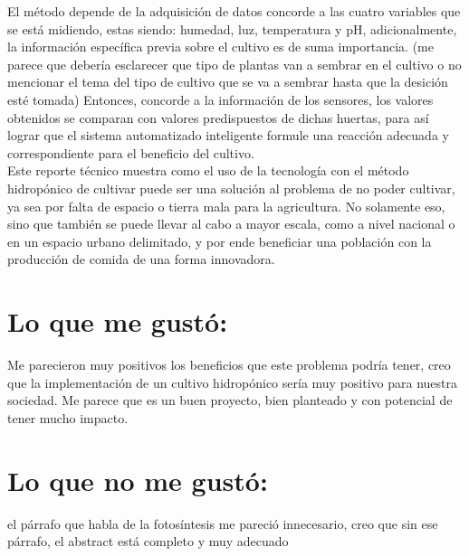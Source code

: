 \documentclass[10pt,a4paper]{article} %
\begin{document}
        \color{blue} El método depende de la adquisición de datos concorde a las cuatro variables
        que se está midiendo, estas siendo: humedad, luz, temperatura y pH, \color{black}
        \color{red} adicionalmente, la información específica previa sobre el cultivo es de suma
        importancia. \color{black}  (me parece que debería esclarecer que tipo
        de plantas van a sembrar en el cultivo o no mencionar el
        tema del tipo de cultivo que se va a sembrar hasta que la desición esté
        tomada)\color{blue} Entonces, concorde a la información de los
        sensores, los valores
        obtenidos se comparan con valores predispuestos de dichas huertas, para así
        lograr que el sistema automatizado inteligente formule una reacción adecuada y
        correspondiente para el beneficio del cultivo. \color{black}  \\

        \color{blue} Este reporte técnico muestra como el uso de la tecnología con el método
        hidropónico de cultivar puede ser una solución al problema de no poder
        cultivar, ya sea por falta de espacio o tierra mala para la agricultura. No
        solamente eso, sino que también se puede llevar al cabo a mayor escala, como a
        nivel nacional o en un espacio urbano delimitado, y por ende beneficiar una
        población con la producción de comida de una forma innovadora. \color{black}  \\


        \section{Lo que me gustó:}
        Me parecieron muy positivos los beneficios que este problema podría
        tener, creo que la implementación de un cultivo hidropónico sería muy
        positivo para nuestra sociedad. Me parece que es un buen proyecto, bien
        planteado y con potencial de tener mucho impacto.


        \section{Lo que no me gustó:}
           el párrafo que habla de la fotosíntesis me pareció innecesario, creo
           que sin ese párrafo, el abstract está completo y muy adecuado


















    \nocite{*}
    
    
\end{document}
